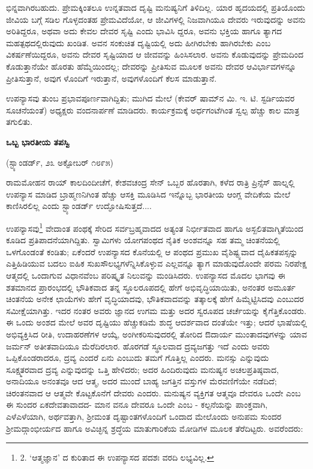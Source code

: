 ಭಿನ್ನವಾಗಿರಬಹುದು. ಪ್ರೇಮಕ್ಕಿಂತಲೂ ಉನ್ನತವಾದ ದೃಷ್ಟಿ ಮನುಷ್ಯನಿಗೆ ತಿಳಿದಿಲ್ಲ. ಯಾರ ಹೃದಯದಲ್ಲಿ ಪ್ರತಿಯೊಂದು ಜೀವಿಯ ಬಗ್ಗೆ ಸಡಿಲ ಗೊಳ್ಳದಂತಹ ಪ್ರೇಮವಿದೆಯೋ, ಆ ಜೀವಿಗಳಲ್ಲಿ ನಿಜವಾಗಿಯೂ ದೇವರು ಇರುವುದನ್ನು ಅವನು ಅರಿತಿದ್ದರೂ, ಅಥವಾ ಅದು ಕೇವಲ ದೇವರ ಸೃಷ್ಟಿ ಎಂದು ಭಾವಿಸಿ ದ್ದರೂ, ಅವನು ಭಕ್ತಿಯ ಹಾಗೂ ತ್ಯಾಗದ ಮಹತ್ಪಥದಲ್ಲಿರುವುದು ಖಂಡಿತ. ಅವನ ಸಂಕುಚಿತ ದೃಷ್ಟಿಯಲ್ಲಿ ಅದು ಹೀಗಿರಬೇಕು ಹಾಗಿರಬೇಕು ಎಂಬ ವಿಕರ್ಷಣೆಯಿದ್ದರೂ, ಅವನು ದೇವರ ಸೃಷ್ಟಿಯಾದ ಆ ಜೀವವನ್ನು ಹಿಂಸಿಸಲಾರ. ಅವನು ಕೊಡುವುದನ್ನು ಪ್ರೇಮದಿಂದ ಕೊಡುತ್ತಾನೆಯೇ ಹೊರತು ಹೆಮ್ಮೆಯಿಂದಲ್ಲ; ದೇವರನ್ನು ಪ್ರೀತಿಸುವ ಮೂಲಕ ಅವನು ದೇವರ ಆವಿರ್ಭಾವಗಳನ್ನೂ ಪ್ರೀತಿಸುತ್ತಾನೆ, ಅವುಗ ಳೊಂದಿಗೆ ಇರುತ್ತಾನೆ, ಅವುಗಳೊಂದಿಗೆ ಕೆಲಸ ಮಾಡುತ್ತಾನೆ.

ಉಪನ್ಯಾಸವು ತುಂಬ ಪ್ರಭಾವಪೂರ್ಣವಾಗಿದ್ದಿತು; ಮುಗಿದ ಮೇಲೆ (ಕೇವರ್ ಷಾಮ್​ನ ಮಿ. ಇ. ಟಿ. ಸ್ಟರ್ಡಿಯವರ ಸೂಚನೆಯಂತೆ) ಅಧ್ಯಕ್ಷರು ವಂದನಾರ್ಪಣೆ ಮಾಡಿದರು. ಕಾರ್ಯಕ್ರಮಕ್ಕೆ ಅರ್ಧಗಂಟೆಗಿಂತ ಸ್ವಲ್ಪ ಹೆಚ್ಚು ಕಾಲ ಮಾತ್ರ ತಗುಲಿತು.

\begin{center}
\textbf{ಒಬ್ಬ ಭಾರತೀಯ ತಪಸ್ವಿ}
\end{center}

\begin{center}
(ಸ್ಟ್ಯಾಂಡರ್ಡ್, ೨೩ ಅಕ್ಟೋಬರ್ ೧೮೯೫)
\end{center}

ರಾಮಮೋಹನ ರಾಯ್​  ಕಾಲದಿಂದೀಚೆಗೆ, ಕೇಶವಚಂದ್ರ  ಸೇನ್ ಒಬ್ಬರ ಹೊರತಾಗಿ, ಕಳೆದ ರಾತ್ರಿ ಪ್ರಿನ್ಸೆಸ್ ಹಾಲ್ನಲ್ಲಿ ಉಪನ್ಯಾಸ ಮಾಡಿದ ಬ್ರಾಹ್ಮಣನಿಗಿಂತ ಹೆಚ್ಚು ಆಸಕ್ತಿ ಮೂಡಿಸಿದ ಇನ್ನೊಬ್ಬ ಭಾರತೀಯ ಆಂಗ್ಲ ವೇದಿಕೆಯ ಮೇಲೆ ಕಾಣಿಸಿರಲಿಲ್ಲ ಎಂದು ಸ್ಟ್ಯಾಂಡರ್ಡ್ ಉದ್ಘೋಷಿಸುತ್ತದೆ....

ಉಪನ್ಯಾಸವು\footnote{2. ‘ಆತ್ಮಜ್ಞಾನ’ ದ ಕುರಿತಾದ ಈ ಉಪನ್ಯಾಸದ ಪದಶಃ ವರದಿ ಲಭ್ಯವಿಲ್ಲ.} ವೇದಾಂತ ಪಂಥಕ್ಕೆ ಸೇರಿದ ಸರ್ವಬ್ರಹ್ಮವಾದದ ಅತ್ಯಂತ ನಿರ್ಭೀತವಾದ ಹಾಗೂ ಅಸ್ಖಲಿತವಾಗ್ಮಿತೆಯಿಂದ ಕೂಡಿದ ಪ್ರತಿಪಾದನೆಯಾಗಿದ್ದಿತು. ಸ್ವಾಮಿಗಳು ಯೋಗಪಂಥದ ನೈತಿಕ ಅಂಶವನ್ನೂ ಸಹ ತಮ್ಮ ಚಿಂತನೆಯಲ್ಲಿ ಒಳಗೊಂಡಂತೆ ಕಂಡಿತು; ಏಕೆಂದರೆ ಉಪನ್ಯಾಸದ ಕೊನೆಯಲ್ಲಿ ಆ ಪಂಥದ ಪ್ರಮುಖ ವೈಶಿಷ್ಟ್ಯವಾದ ದೈಹಿಕತಪಸ್ಸನ್ನು ಎತ್ತಿಹಿಡಿಯುವ ಬದಲು ಐಹಿಕ ಸುಖಸೌಲಭ್ಯಗಳೆನ್ನಿಸಿಕೊಳ್ಳುವ ಎಲ್ಲವನ್ನೂ ತ್ಯಾಗ ಮಾಡುವುದೊಂದೇ ಪರಮ ನಿರಪೇಕ್ಷ ಆತ್ಮದಲ್ಲಿ ಒಂದಾಗುವ ವಿಧಾನವೆಂಬ ಪರಿಷ್ಕೃತ ನಿಲುವನ್ನು ಮಂಡಿಸಿದರು. ಉಪನ್ಯಾಸದ ಮೊದಲ ಭಾಗವು ಈ ಶತಮಾನದ ಪ್ರಾರಂಭದಲ್ಲಿ ಭೌತಿಕವಾದ ತನ್ನ ಸ್ಥೂಲರೂಪದಲ್ಲಿ ಹೇಗೆ ಅಭಿವೃದ್ಧಿಯಾಯಿತು, ಅನಂತರ ಅಮೂರ್ತ ಚಿಂತನೆಯ ಅನೇಕ ಛಾಯೆಗಳು ಹೇಗೆ ವೃದ್ಧಿಯಾದವು, ಭೌತಿಕವಾದವನ್ನು ತತ್ಕಾಲಕ್ಕೆ ಹೇಗೆ ಹಿಮ್ಮೆಟ್ಟಿಸಿದವು ಎಂಬುದರ ಸಮೀಕ್ಷೆಯಾಗಿತ್ತು. ಇದರ ನಂತರ ಅವರು ಜ್ಞಾನದ ಉಗಮ ಮತ್ತು ಅದರ ಸ್ವರೂಪದ ಚರ್ಚೆಯನ್ನು ಕೈಗೆತ್ತಿಕೊಂಡರು. ಈ ಒಂದು ಅಂಶದ ಮೇಲೆ ಅವರ ದೃಷ್ಟಿಯು ಹೆಚ್ಚುಕಡಿಮೆ ಶುದ್ಧ ಆದರ್ಶವಾದ ದಂತೆಯೇ ಇತ್ತು; ಆದರೆ ಭಾಷೆಯಲ್ಲಿ ಅಭಿವ್ಯಕ್ತಿಸಿದ ರೀತಿ, ಉದಾಹರಣೆಗಳ ಆಯ್ಕೆ, ಅಂಗೀಕರಿಸುವುದರಲ್ಲಿ ತೋರಿದ ಔದಾರ್ಯ ಮುಂತಾದವುಗಳನ್ನು ಯಾವ ಜರ್ಮನ್ ಅತೀತವಾದಿಯೂ ಮೆರೆದಿರಲಾರ. ಹೊರಗಡೆ ಸ್ಥೂಲವಾದ ದ್ರವ್ಯಜಗತ್ತು ಇದೆ ಎಂದು ಅವರು ಒಪ್ಪಿಕೊಂಡರಾದರೂ, ದ್ರವ್ಯ ಎಂದರೆ ಏನು ಎಂಬುದು ತಮಗೆ ಗೊತ್ತಿಲ್ಲ ಎಂದರು. ಮನಸ್ಸು ಎನ್ನುವುದು ಸೂಕ್ಷ್ಮತರವಾದ ದ್ರವ್ಯ ಎನ್ನುವುದನ್ನು ಒತ್ತಿ ಹೇಳಿದರು; ಅದರ ಹಿಂದಿರುವುದು ಮನುಷ್ಯನ ಅಚಲಪ್ರತಿಷ್ಠವಾದ, ಅನಾದಿಯೂ ಅನಂತವೂ ಆದ ಆತ್ಮ, ಅದರ ಮುಂದೆ ಬಾಹ್ಯ ಜಗತ್ತಿನ ವಸ್ತುಗಳ ಮೆರವಣಿಗೆಯೇ ನಡೆದಿದೆ; ಚಿರಂತನವಾದ ಆ ಆತ್ಮವೇ ಕೊಟ್ಟಕೊನೆಗೆ ದೇವರು ಎಂದರು. ಮನುಷ್ಯನ ವ್ಯಕ್ತಿಗತ ಆತ್ಮವೂ ದೇವರೂ ಒಂದೇ ಎಂಬ ಈ ಸುಂದರ ಏಕದೇವತಾವಾದದ- ಮಾನ ವನೂ ದೇವರೂ ಒಂದೇ ಎಂಬ - ಕಲ್ಪನೆಯನ್ನು ಪಾಂಕ್ತವಾಗಿ, ಎಳೆಎಳೆಯಾಗಿ, ಅರ್ಥವತ್ತಾಗಿ, ಶ‍್ರೀಮಂತ ದೃಷ್ಟಾಂತಗಳೊಂದಿಗೆ ಒಂದಾದ ಮೇಲೊಂದು ಅನುಪಮ ಸುಂದರ ಶ‍್ರೀಮದ್ಗಾಂಭೀರ್ಯದ ಹಾಗೂ ಅವಿಚ್ಛಿನ್ನ ಶ್ರದ್ಧೆಯ ಮಾತುಗಾರಿಕೆಯ ಮೋಡಿಗಳ ಮೂಲಕ ತೆರೆದಿಟ್ಟರು. ಅವರೆಂದರು:

